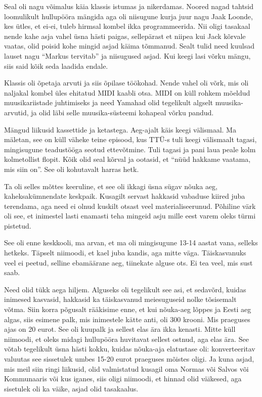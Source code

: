 Seal oli nagu võimalus käia klassis istumas ja nikerdamas. Noored nagad tahtsid loomulikult hullupööra mängida aga oli niisugune kurja juur nagu Jaak Loonde, kes ütles, et ei-ei, tuleb hirmsal kombel ikka programmeerida. Nii oligi tasakaal nende kahe asja vahel üsna hästi paigas, sellepärast et niipea kui Jack kõrvale vaatas, olid poisid kohe mingid asjad käima tõmmanud. Sealt tulid need kuulsad lauset nagu \enquote{Markus tervitab} ja niisugused asjad. Kui keegi lasi võrku mängu, siis said kõik seda laadida endale. 


Klassis oli õpetaja arvuti ja siis õpilase töökohad. Nende vahel oli võrk, mis oli naljakal kombel üles ehitatud MIDI kaabli otsa. MIDI on küll rohkem mõeldud  muusikariistade juhtimiseks ja need Yamahad olid tegelikult algselt muusika-arvutid, ja olid läbi selle muusika-süsteemi kohapeal võrku pandud.

Mängud liikusid kassettide ja ketastega. Aeg-ajalt käis keegi välismaal. Ma mäletan, see on küll väheke teine episood, kus TTÜ-s tuli keegi välismaalt tagasi,  mingisugune teadustööga seotud ettevõtmine. Tuli tagasi ja pani laua peale kolm kolmetollist flopit. Kõik olid seal kõrval ja ootasid, et \enquote{nüüd hakkame vaatama, mis siin on}. See oli kohutavalt harras hetk.
                 

Ta oli selles mõttes keeruline, et see oli ikkagi üsna sügav nõuka aeg, kaheksakümnendate keskpaik. Kusagilt servast hakkasid vabaduse kiired juba terendama, aga need ei olnud kuskilt otsast veel materialiseerunud. Põhiline värk oli see, et inimestel lasti enamasti teha mingeid asju mille eest varem oleks türmi pistetud.

                 
See oli enne keskkooli, ma arvan, et ma oli mingisugune 13-14 aastat vana, selleks hetkeks. Täpselt niimoodi, et kael juba kandis, aga mitte väga. Täiskasvanuks  veel ei peetud, selline ebamäärane aeg, tiinekate alguse ots. Ei tea veel, mis sust saab.


Need olid  tükk aega hiljem. Alguseks oli tegelikult see asi, et sedavõrd, kuidas inimesed kasvasid, hakkasid ka täiskasvanud  meiesuguseid nolke tõsisemalt võtma. Siin korra põgusalt rääkisime enne, et kui nõuka-aeg lõppes ja Eesti aeg algas, siis esimene palk, mis inimestele kätte anti, oli 300 krooni. Mis praeguses ajas on 20 eurot. See oli kuupalk ja sellest elas ära ikka kenasti. Mitte küll niimoodi, et oleks midagi hullupööra huvitavat sellest ostnud, aga elas ära. See võtab tegelikult üsna hästi kokku, kuidas nõuka-aja elatustase oli: konverteeritav valuutas see sissetulek umbes 15-20 eurot praeguses mõistes oligi. Ja kuna asjad, mis meil siin ringi liikusid, olid valmistatud kusagil oma Normas või Salvos või Kommunaaris või kus iganes,  siis  oligi niimoodi,  et hinnad olid väikesed, aga sisetulek oli ka väike, asjad olid tasakaalus. 

